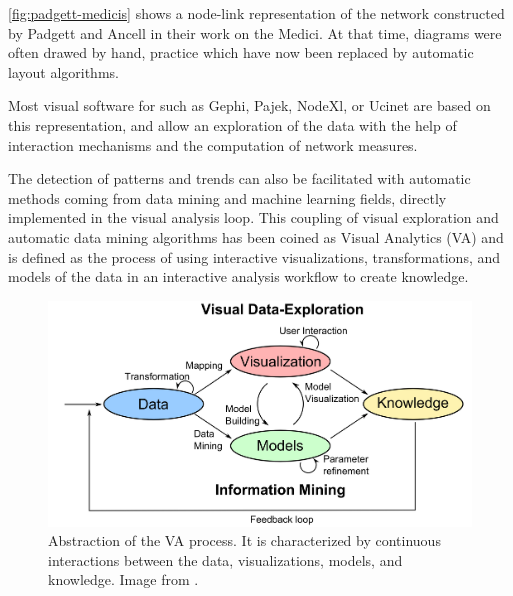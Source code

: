 \autoref{fig:padgett-medicis} shows a node-link representation of the network constructed by Padgett and Ancell in their work on the Medici.
At that time, diagrams were often drawed by hand, practice which have now been replaced by automatic layout algorithms.

Most visual software for \sna such as Gephi, Pajek, NodeXl, or Ucinet are based on this representation, and allow an exploration of the data with the help of interaction mechanisms and the computation of network measures.


The detection of patterns and trends can also be facilitated with automatic methods coming from data mining and machine learning fields, directly implemented in the visual analysis loop.
This coupling of visual exploration and automatic data mining algorithms has been coined as Visual Analytics (VA) and is defined as the process of using interactive visualizations, transformations, and models of the data in an interactive analysis workflow to create knowledge\cite{keimVisualAnalyticsDefinition2008}.

\begin{figure}
    \centering %
    \includegraphics[width=1\textwidth]{static/figures/RelatedWork/Keim-VisualAnalytics.png}
    \caption{Abstraction of the VA process. It is characterized by continuous interactions between the data, visualizations, models, and knowledge. Image from \cite{keimVisualAnalyticsDefinition2008}.}
    \label{fig:keim-va}
\end{figure}

